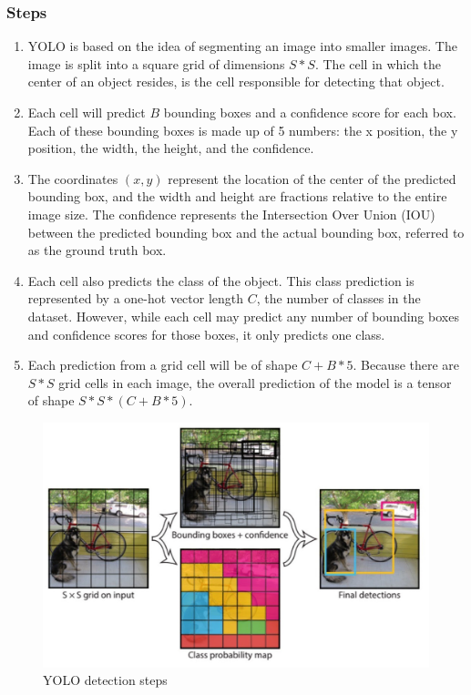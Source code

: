\subsubsection{Steps}
\begin{enumerate}
	\item YOLO is based on the idea of segmenting an image into smaller images. The image is split into a square grid of dimensions $S*S$. The cell in which the center of an object resides, is the cell responsible for detecting that object. 
	
	\item Each cell will predict $B$ bounding boxes and a confidence score for each box. Each of these bounding boxes is made up of 5 numbers: the x position, the y position, the width, the height, and the confidence. 
	
	\item The coordinates $(x, y)$ represent the location of the center of the predicted bounding box, and the width and height are fractions relative to the entire image size. The confidence represents the Intersection Over Union (IOU) between the predicted bounding box and the actual bounding box, referred to as the ground truth box. 
	
	\item Each cell also predicts the class of the object. This class prediction is represented by a one-hot vector length $C$, the number of classes in the dataset. However, while each cell may predict any number of bounding boxes and confidence scores for those boxes, it only predicts one class. 
	
	\item Each prediction from a grid cell will be of shape $C + B * 5$. Because there are $S*S$ grid cells in each image, the overall prediction of the model is a tensor of shape $S*S*(C+B*5)$.
\end{enumerate}
\begin{figure}[H]
	\centering
	\includegraphics[width=0.7\linewidth]{Images/yolo_steps}
	\caption{YOLO detection steps}
\end{figure}

